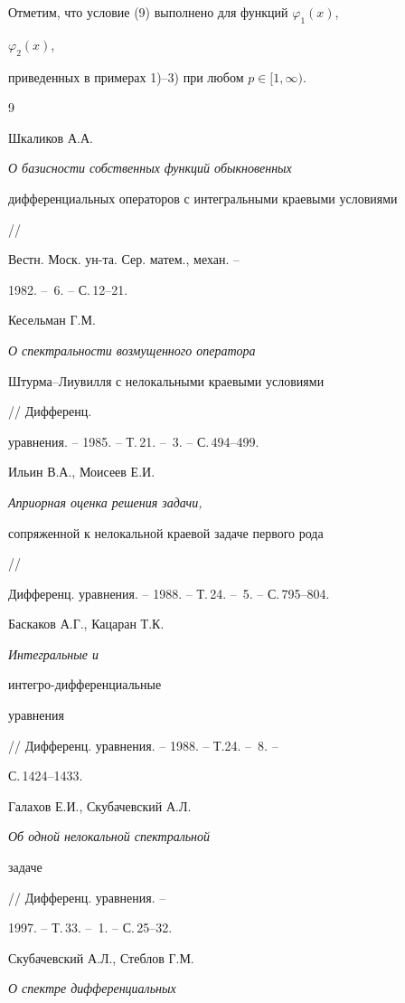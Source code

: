 Отметим, что условие (9) выполнено для функций $\varphi_1(x)$, 


$\varphi_2(x)$, 


приведенных в примерах 1)--3) при любом $p\in[1,\infty)$. 


 


\begin{thebibliography}{9} 


 




Шкаликов А.А. {\em О базисности собственных функций обыкновенных 


дифференциальных операторов с интегральными краевыми условиями} // 


Вестн. Моск. ун-та. Сер. матем., механ. -- 


1982. -- \No\,6. -- С.\,12--21. 




Кесельман Г.М. {\em О спектральности возмущенного оператора  


Штурма--Лиувилля с нелокальными краевыми условиями} // Дифференц. 


уравнения. -- 1985. -- Т.\,21. -- \No\,3. -- С.\,494--499. 




Ильин В.А., Моисеев Е.И. {\em Априорная оценка решения задачи,  


сопряженной к нелокальной краевой задаче первого рода} // 


Дифференц. уравнения. -- 1988. -- Т.\,24. -- \No\,5. -- С.\,795--804. 




Баскаков А.Г., Кацаран Т.К. {\em Интегральные и 


интегро-дифференциальные 


уравнения} // Дифференц. уравнения. -- 1988. -- Т.24. -- \No\,8. -- 


С.\,1424--1433. 




Галахов Е.И., Скубачевский А.Л. {\em Об одной нелокальной спектральной 


задаче} // Дифференц. уравнения. -- 


1997. -- Т.\,33. -- \No\,1. -- С.\,25--32. 




Скубачевский А.Л., Стеблов Г.М. {\em О спектре дифференциальных  


}
\end{thebibliography}
